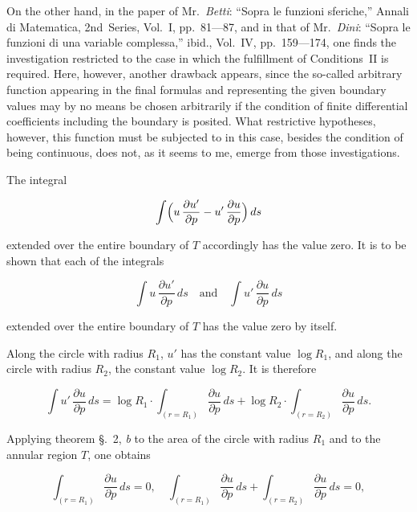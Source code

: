 \documentclass{article}
\begin{document}
On the other hand, in the paper of Mr.~\emph{Betti}: ``Sopra le funzioni sferiche,'' Annali di Matematica, 2nd~Series, Vol.~I, pp.~81---87, and in that of Mr.~\emph{Dini}: ``Sopra le funzioni di una variable complessa,'' ibid., Vol.~IV, pp.~159---174, one finds the investigation restricted to the case in which the fulfillment of Conditions~II is required. Here, however, another drawback appears, since the so-called arbitrary function appearing in the final formulas and representing the given boundary values may by no means be chosen arbitrarily if the condition of finite differential coefficients including the boundary is posited. What restrictive hypotheses, however, this function must be subjected to in this case, besides the condition of being continuous, does not, as it seems to me, emerge from those investigations.




The integral

\[

\int \Bigl(u\,\frac{\partial u'}{\partial p} - u'\,\frac{\partial u}{\partial p}\Bigr)\,ds

\]

extended over the entire boundary of $T$ accordingly has the value zero. It is to be shown that each of the integrals

\[

\int u\,\frac{\partial u'}{\partial p}\,ds \quad \text{and} \quad \int u'\,\frac{\partial u}{\partial p}\,ds

\]

extended over the entire boundary of $T$ has the value zero by itself.



Along the circle with radius $R_1$, $u'$ has the constant value $\log R_1$, and along the circle with radius $R_2$, the constant value $\log R_2$. It is therefore

\[

\int u'\,\frac{\partial u}{\partial p}\,ds = \log R_1 \cdot \int_{(r = R_1)} \frac{\partial u}{\partial p}\,ds + \log R_2 \cdot \int_{(r = R_2)} \frac{\partial u}{\partial p}\,ds.

\]

Applying theorem §.~2, \emph{b} to the area of the circle with radius $R_1$ and to the annular region $T$, one obtains

\[

\int_{(r = R_1)} \frac{\partial u}{\partial p}\,ds = 0, \quad \int_{(r = R_1)} \frac{\partial u}{\partial p}\,ds + \int_{(r = R_2)} \frac{\partial u}{\partial p}\,ds = 0,

\]
\end{document}
